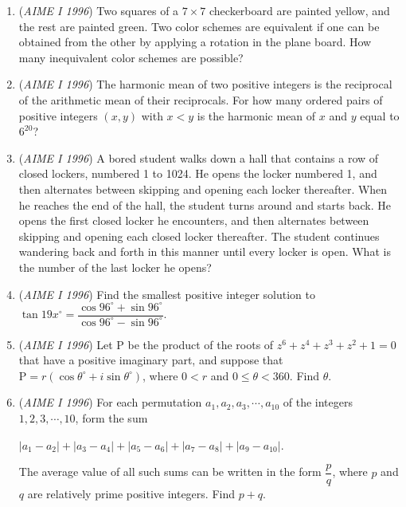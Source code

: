 \begin{enumerate}
 

	\item (\textit{AIME I 1996}) Two squares of a $7\times 7$ checkerboard are painted yellow, and the rest are painted green. Two color schemes are equivalent if one can be obtained from the other by applying a rotation in the plane board. How many inequivalent color schemes are possible?


 

	\item (\textit{AIME I 1996}) The harmonic mean of two positive integers is the reciprocal of the arithmetic mean of their reciprocals. For how many ordered pairs of positive integers $(x,y)$ with $x<y$ is the harmonic mean of $x$ and $y$ equal to $6^{20}$?


 

	\item (\textit{AIME I 1996}) A bored student walks down a hall that contains a row of closed lockers, numbered 1 to 1024. He opens the locker numbered 1, and then alternates between skipping and opening each locker thereafter. When he reaches the end of the hall, the student turns around and starts back. He opens the first closed locker he encounters, and then alternates between skipping and opening each closed locker thereafter. The student continues wandering back and forth in this manner until every locker is open. What is the number of the last locker he opens?


 

	\item (\textit{AIME I 1996}) Find the smallest positive integer solution to $\tan{19x^{\circ}}=\dfrac{\cos{96^{\circ}}+\sin{96^{\circ}}}{\cos{96^{\circ}}-\sin{96^{\circ}}}$.


 

	\item (\textit{AIME I 1996}) Let $\mathrm {P}$ be the product of the roots of $z^6+z^4+z^3+z^2+1=0$ that have a positive imaginary part, and suppose that $\mathrm {P}=r(\cos{\theta^{\circ}}+i\sin{\theta^{\circ}})$, where $0<r$ and $0\leq \theta <360$. Find $\theta$.


 

	\item (\textit{AIME I 1996}) For each permutation $a_1,a_2,a_3,\cdots,a_{10}$ of the integers $1,2,3,\cdots,10$, form the sum


 $|a_1-a_2|+|a_3-a_4|+|a_5-a_6|+|a_7-a_8|+|a_9-a_{10}|$.


 The average value of all such sums can be written in the form $\dfrac{p}{q}$, where $p$ and $q$ are relatively prime positive integers. Find $p+q$.



\end{enumerate}

